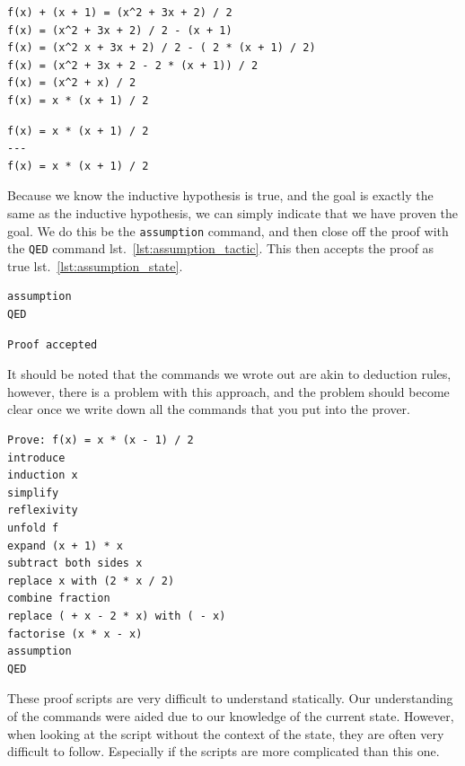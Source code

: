 \documentclass[
]{article}
\begin{document}
\hypertarget{lst:intermediate_states}{%
\label{lst:intermediate_states}}%
\begin{verbatim}
f(x) + (x + 1) = (x^2 + 3x + 2) / 2
f(x) = (x^2 + 3x + 2) / 2 - (x + 1)
f(x) = (x^2 x + 3x + 2) / 2 - ( 2 * (x + 1) / 2)
f(x) = (x^2 + 3x + 2 - 2 * (x + 1)) / 2
f(x) = (x^2 + x) / 2
f(x) = x * (x + 1) / 2
\end{verbatim}

\hypertarget{lst:rearangement_state}{%
\label{lst:rearangement_state}}%
\begin{verbatim}
f(x) = x * (x + 1) / 2
---
f(x) = x * (x + 1) / 2
\end{verbatim}

Because we know the inductive hypothesis is true, and the goal is
exactly the same as the inductive hypothesis, we can simply indicate
that we have proven the goal. We do this be the \texttt{assumption}
command, and then close off the proof with the \texttt{QED} command
lst.~\ref{lst:assumption_tactic}. This then accepts the proof as true
lst.~\ref{lst:assumption_state}.

\hypertarget{lst:assumption_tactic}{%
\label{lst:assumption_tactic}}%
\begin{verbatim}
assumption
QED
\end{verbatim}

\hypertarget{lst:assumption_state}{%
\label{lst:assumption_state}}%
\begin{verbatim}
Proof accepted
\end{verbatim}

It should be noted that the commands we wrote out are akin to deduction
rules, however, there is a problem with this approach, and the problem
should become clear once we write down all the commands that you put
into the prover.

\hypertarget{lst:final_proof_script}{%
\label{lst:final_proof_script}}%
\begin{verbatim}
Prove: f(x) = x * (x - 1) / 2
introduce
induction x
simplify
reflexivity
unfold f
expand (x + 1) * x
subtract both sides x
replace x with (2 * x / 2)
combine fraction
replace ( + x - 2 * x) with ( - x)
factorise (x * x - x)
assumption
QED
\end{verbatim}

These proof scripts are very difficult to understand statically. Our
understanding of the commands were aided due to our knowledge of the
current state. However, when looking at the script without the context
of the state, they are often very difficult to follow. Especially if the
scripts are more complicated than this one.
\end{document}
